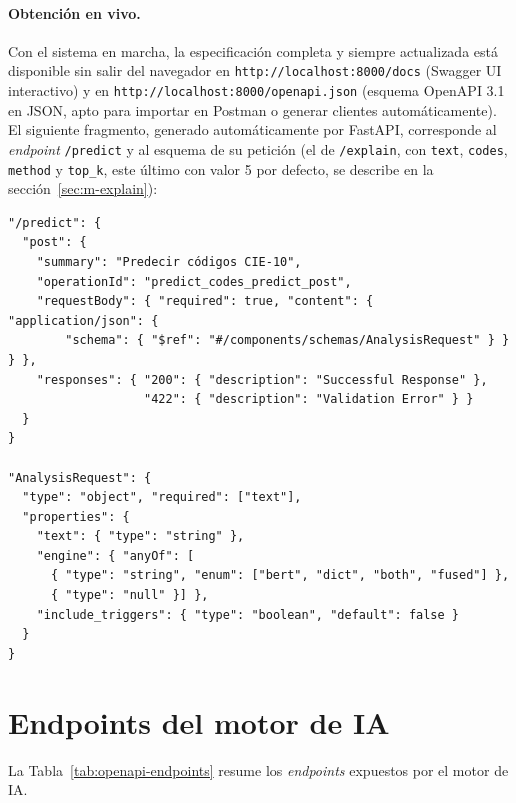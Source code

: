 \paragraph{Obtención en vivo.} Con el sistema en marcha, la especificación completa y siempre actualizada está disponible sin salir del navegador en \texttt{http://localhost:8000/docs} (Swagger UI interactivo) y en \texttt{http://localhost:8000/openapi.json} (esquema OpenAPI 3.1 en JSON, apto para importar en Postman o generar clientes automáticamente). El siguiente fragmento, generado automáticamente por FastAPI, corresponde al \emph{endpoint} \texttt{/predict} y al esquema de su petición (el de \texttt{/explain}, con \texttt{text}, \texttt{codes}, \texttt{method} y \texttt{top\_k}, este último con valor 5 por defecto, se describe en la sección~\ref{sec:m-explain}):

{\small
\begin{verbatim}
"/predict": {
  "post": {
    "summary": "Predecir códigos CIE-10",
    "operationId": "predict_codes_predict_post",
    "requestBody": { "required": true, "content": { "application/json": {
        "schema": { "$ref": "#/components/schemas/AnalysisRequest" } } } },
    "responses": { "200": { "description": "Successful Response" },
                   "422": { "description": "Validation Error" } }
  }
}

"AnalysisRequest": {
  "type": "object", "required": ["text"],
  "properties": {
    "text": { "type": "string" },
    "engine": { "anyOf": [
      { "type": "string", "enum": ["bert", "dict", "both", "fused"] },
      { "type": "null" }] },
    "include_triggers": { "type": "boolean", "default": false }
  }
}
\end{verbatim}
}

\section{Endpoints del motor de IA}

La Tabla~\ref{tab:openapi-endpoints} resume los \emph{endpoints} expuestos por el motor de IA.

